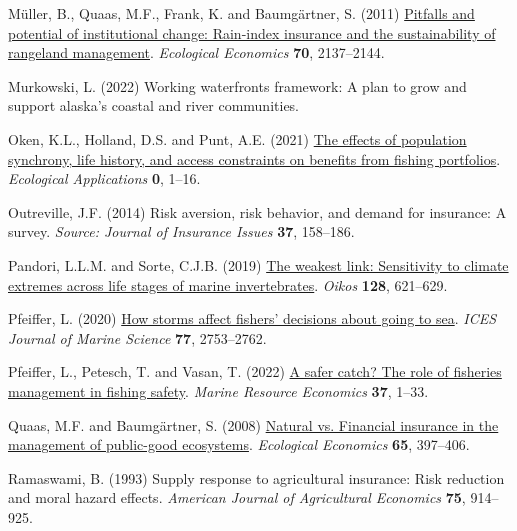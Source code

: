 \documentclass[
  letterpaper,
  DIV=11,
  numbers=noendperiod]{scrartcl}
\newlength{\cslhangindent}
\newlength{\cslentryspacingunit} %
\newenvironment{CSLReferences}[2] %
 {%
  \setlength{\parindent}{0pt}
  \ifodd #1
  \let\oldpar\par
  \def\par{\hangindent=\cslhangindent\oldpar}
  \fi
  \setlength{\parskip}{#2\cslentryspacingunit}
 }%
 {}
\theoremstyle{plain}
\theoremstyle{plain}
\theoremstyle{remark}
\begin{document}
\begin{CSLReferences}{1}{0}
\leavevmode{}%
Müller, B., Quaas, M.F., Frank, K. and Baumgärtner, S. (2011)
\href{https://doi.org/10.1016/j.ecolecon.2011.06.011}{Pitfalls and
potential of institutional change: Rain-index insurance and the
sustainability of rangeland management}. \emph{Ecological Economics}
\textbf{70}, 2137--2144.

\leavevmode{}%
Murkowski, L. (2022) Working waterfronts framework: A plan to grow and
support alaska's coastal and river communities.

\leavevmode{}%
Oken, K.L., Holland, D.S. and Punt, A.E. (2021)
\href{https://doi.org/10.1002/eap.2307}{The effects of population
synchrony, life history, and access constraints on benefits from fishing
portfolios}. \emph{Ecological Applications} \textbf{0}, 1--16.

\leavevmode{}%
Outreville, J.F. (2014) Risk aversion, risk behavior, and demand for
insurance: A survey. \emph{Source: Journal of Insurance Issues}
\textbf{37}, 158--186.

\leavevmode{}%
Pandori, L.L.M. and Sorte, C.J.B. (2019)
\href{https://doi.org/10.1111/oik.05886}{The weakest link: Sensitivity
to climate extremes across life stages of marine invertebrates}.
\emph{Oikos} \textbf{128}, 621--629.

\leavevmode{}%
Pfeiffer, L. (2020) \href{https://doi.org/10.1093/icesjms/fsaa145}{How
storms affect fishers' decisions about going to sea}. \emph{ICES Journal
of Marine Science} \textbf{77}, 2753--2762.

\leavevmode{}%
Pfeiffer, L., Petesch, T. and Vasan, T. (2022)
\href{https://doi.org/10.1086/716856}{A safer catch? The role of
fisheries management in fishing safety}. \emph{Marine Resource
Economics} \textbf{37}, 1--33.

\leavevmode{}%
Quaas, M.F. and Baumgärtner, S. (2008)
\href{https://doi.org/10.1016/j.ecolecon.2007.07.004}{Natural vs.
Financial insurance in the management of public-good ecosystems}.
\emph{Ecological Economics} \textbf{65}, 397--406.

\leavevmode{}%
Ramaswami, B. (1993) Supply response to agricultural insurance: Risk
reduction and moral hazard effects. \emph{American Journal of
Agricultural Economics} \textbf{75}, 914--925.


\end{CSLReferences}
\end{document}
